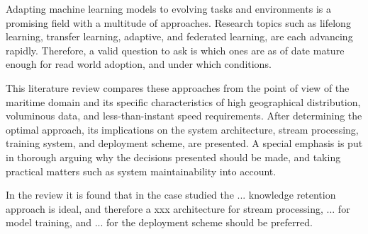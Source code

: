 
Adapting machine learning models to evolving tasks and environments is a promising field with a multitude of approaches. Research topics such as lifelong learning, transfer learning, adaptive, and federated learning, are each advancing rapidly. Therefore, a valid question to ask is which ones are as of date mature enough for read world adoption, and under which conditions.

This literature review compares these approaches from the point of view of the maritime domain and its specific characteristics of high geographical distribution, voluminous data, and less-than-instant speed requirements. After determining the optimal approach, its implications on the system architecture, stream processing, training system, and deployment scheme, are presented. A special emphasis is put in thorough arguing why the decisions presented should be made, and taking practical matters such as system maintainability into account.

In the review it is found that in the case studied the ... knowledge retention approach is ideal, and therefore a xxx architecture for stream processing,  ... for model training, and ... for the deployment scheme should be preferred. %



  


